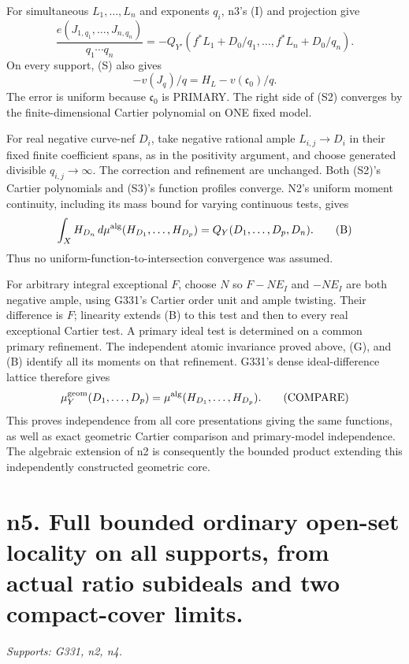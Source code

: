 \documentclass[11pt]{article}
\begin{document}
For simultaneous \(L_1,\ldots,L_n\) and exponents \(q_i\), n3's (I) and projection give
\[
\frac{e(J_{1,q_1},\ldots,J_{n,q_n})}{q_1\cdots q_n}
=-Q_{Y'}(f^*L_1+D_0/q_1,\ldots,f^*L_n+D_0/q_n). \tag{S2}
\]
On every support, (S) also gives
\[
-v(J_q)/q=H_L-v(\mathfrak c_0)/q. \tag{S3}
\]
The error is uniform because \(\mathfrak c_0\) is PRIMARY. The right side of (S2) converges by the finite-dimensional Cartier polynomial on ONE fixed model.

For real negative curve-nef \(D_i\), take negative rational ample \(L_{i,j}\to D_i\) in their fixed finite coefficient spans, as in the positivity argument, and choose generated divisible \(q_{i,j}\to\infty\). The correction and refinement are unchanged. Both (S2)'s Cartier polynomials and (S3)'s function profiles converge. N2's uniform moment continuity, including its mass bound for varying continuous tests, gives
\[
\int_X H_{D_n}\,d\mu^{\rm alg}(H_{D_1},\ldots,H_{D_p})
=Q_Y(D_1,\ldots,D_p,D_n). \tag{B}
\]
Thus no uniform-function-to-intersection convergence was assumed.

For arbitrary integral exceptional \(F\), choose \(N\) so \(F-NE_I\) and \(-NE_I\) are both negative ample, using G331's Cartier order unit and ample twisting. Their difference is \(F\); linearity extends (B) to this test and then to every real exceptional Cartier test. A primary ideal test is determined on a common primary refinement. The independent atomic invariance proved above, (G), and (B) identify all its moments on that refinement. G331's dense ideal-difference lattice therefore gives
\[
\mu_Y^{\rm geom}(D_1,\ldots,D_p)
=\mu^{\rm alg}(H_{D_1},\ldots,H_{D_p}). \tag{COMPARE}
\]
This proves independence from all core presentations giving the same functions, as well as exact geometric Cartier comparison and primary-model independence. The algebraic extension of n2 is consequently the bounded product extending this independently constructed geometric core.

\section{n5. Full bounded ordinary open-set locality on all supports, from actual ratio subideals and two compact-cover limits.}
\textit{Supports: G331, n2, n4.}
\end{document}

